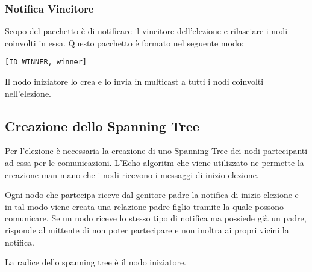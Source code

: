 \subsubsection{Notifica Vincitore}\label{pacchetto_vincitore}
Scopo del pacchetto è di notificare il vincitore dell'elezione e rilasciare i nodi coinvolti in essa. Questo pacchetto è formato nel seguente modo:

\begin{lstlisting}
[ID_WINNER, winner]
\end{lstlisting}

Il nodo iniziatore lo crea e lo invia in multicast a tutti i nodi coinvolti nell'elezione.

\subsection{Creazione dello Spanning Tree}

Per l'elezione è necessaria la creazione di uno Spanning Tree dei nodi partecipanti ad essa per le comunicazioni. L'Echo algoritm che viene utilizzato ne permette la creazione man mano che i nodi ricevono i messaggi di inizio elezione.

Ogni nodo che partecipa riceve dal genitore padre la notifica di inizio elezione e in tal modo viene creata una relazione padre-figlio tramite la quale possono comunicare. Se un nodo riceve lo stesso tipo di notifica ma possiede già un padre, risponde al mittente di non poter partecipare e non inoltra ai propri vicini la notifica.

La radice dello spanning tree è il nodo iniziatore.

